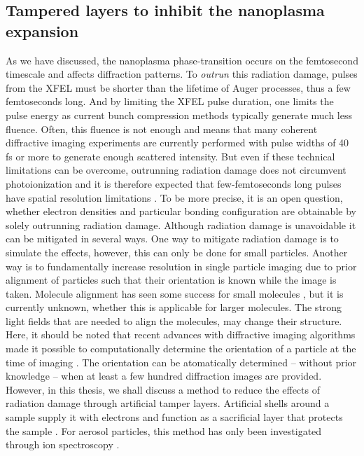 \subsection{Tampered layers to inhibit the nanoplasma expansion}
%
%
As we have discussed, the nanoplasma phase-transition occurs on the femtosecond timescale and affects diffraction patterns. To \textit{outrun} this radiation damage, pulses from the XFEL must be shorter than the lifetime of Auger processes, thus a few femtoseconds long. And by limiting the XFEL pulse duration, one limits the pulse energy as current bunch compression methods typically generate much less fluence. Often, this fluence is not enough and means that many coherent diffractive imaging experiments are currently performed with pulse widths of 40 fs or more to generate enough scattered intensity. But even if these technical limitations can be overcome, outrunning radiation damage does not circumvent photoionization and it is therefore expected that few-femtoseconds long pulses have spatial resolution limitations \citep{Aquila-2015-StrucDyn}. To be more precise, it is an open question, whether electron densities and particular bonding configuration are obtainable by solely outrunning radiation damage. Although radiation damage is unavoidable it can be mitigated in several ways. One way to mitigate radiation damage is to simulate the effects, however, this can only be done for small particles. Another way is to fundamentally increase resolution in single particle imaging due to prior alignment of particles such that their orientation is known while the image is taken. Molecule alignment has seen some success for small molecules \citep{Kupper-2014-PRL}, but it is currently unknown, whether this is applicable for larger molecules. The strong light fields that are needed to align the molecules, may change their structure. Here, it should be noted that recent advances with diffractive imaging algorithms made it possible to computationally determine the orientation of a particle at the time of imaging \citep{Loh-2009-PRE,Ekeberg-2015-PRL}. The orientation can be atomatically determined -- without prior knowledge -- when at least a few hundred diffraction images are provided. However, in this thesis, we shall discuss a method to reduce the effects of radiation damage through artificial tamper layers. Artificial shells around a sample supply it with electrons and function as a sacrificial layer that protects the sample \citep{Hau-Riege-2010-PRL}. For aerosol particles, this method has only been investigated through ion spectroscopy \citep{Hoener-2008-JPB,Ziemkewitz-2017-unpublished}.\\[1\baselineskip]
